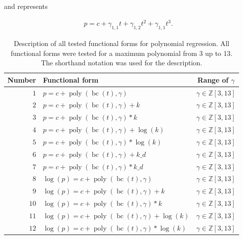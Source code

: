 \documentclass[12pt,a4paper]{article}
\DeclareMathOperator{\bc}{bc}
\DeclareMathOperator{\poly}{poly}
\begin{document}
and represents

\begin{align}
    p = c + \gamma_{1,1} t + \gamma_{1,2} t^2 + \gamma_{1,1} t^3 .
\end{align}

\begin{table}
    \centering
    \caption{Description of all tested functional forms for polynomial regression. All functional forms were tested for a maximum polynomial from 3 up to 13. The shorthand notation was used for the description.}
    \label{tab:func_form}    
    \begin{tabular}{rlc}
        Number & Functional form & Range of $\gamma$ \\
        \toprule
        $1$ & $p = c + \poly\left( \bc(t), \gamma \right) $ & $\gamma \in \mathbb{Z} \left[3, 13 \right]$\\ 
        $2$ & $p = c + \poly\left( \bc(t), \gamma \right) + k $ & $\gamma \in \mathbb{Z} \left[3, 13 \right]$\\
        $3$ & $p = c + \poly\left( \bc(t), \gamma \right) * k $ & $\gamma \in \mathbb{Z} \left[3, 13 \right]$\\
        $4$ & $p = c + \poly\left( \bc(t), \gamma \right) + \log(k) $ & $\gamma \in \mathbb{Z} \left[3, 13 \right]$\\
        $5$ & $p = c + \poly\left( \bc(t), \gamma \right) * \log(k) $ & $\gamma \in \mathbb{Z} \left[3, 13 \right]$\\
        $6$ & $p = c + \poly\left( \bc(t), \gamma \right) + k\_d $ & $\gamma \in \mathbb{Z} \left[3, 13 \right]$\\
        $7$ & $p = c + \poly\left( \bc(t), \gamma \right) * k\_d $ & $\gamma \in \mathbb{Z} \left[3, 13 \right]$\\ %
        \midrule
        $8$ & $\log(p) = c + \poly\left( \bc(t), \gamma \right) $ & $\gamma \in \mathbb{Z} \left[3, 13 \right]$\\ 
        $9$ & $\log(p) = c + \poly\left( \bc(t), \gamma \right) + k $ & $\gamma \in \mathbb{Z} \left[3, 13 \right]$\\
        $10$ & $\log(p) = c + \poly\left( \bc(t), \gamma \right) * k $ & $\gamma \in \mathbb{Z} \left[3, 13 \right]$\\
        $11$ & $\log(p) = c + \poly\left( \bc(t), \gamma \right) + \log(k) $ & $\gamma \in \mathbb{Z} \left[3, 13 \right]$\\
        $12$ & $\log(p) = c + \poly\left( \bc(t), \gamma \right) * \log(k) $ & $\gamma \in \mathbb{Z} \left[3, 13 \right]$\\

\end{tabular}
\end{table}
\end{document}
